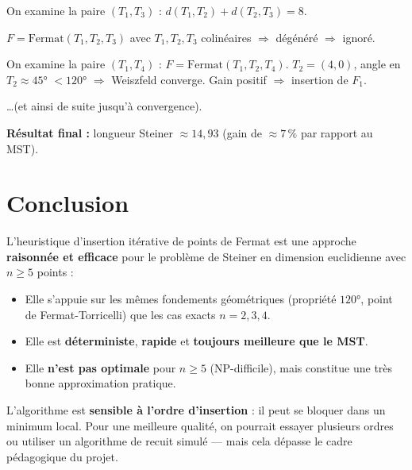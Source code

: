 \documentclass[12pt,a4paper]{article}
\begin{document}
On examine la paire $(T_1, T_3)$ :
$d(T_1, T_2) + d(T_2, T_3) = 8$.

$F = \text{Fermat}(T_1, T_2, T_3)$ avec $T_1, T_2, T_3$ colinéaires
$\Rightarrow$ dégénéré $\Rightarrow$ ignoré.

On examine la paire $(T_1, T_4)$ :
$F = \text{Fermat}(T_1, T_2, T_4)$.
$T_2 = (4,0)$, angle en $T_2 \approx 45°$ $< 120°$ $\Rightarrow$ Weiszfeld converge.
Gain positif $\Rightarrow$ insertion de $F_1$.

\ldots (et ainsi de suite jusqu'à convergence).

\medskip
\textbf{Résultat final :} longueur Steiner $\approx 14{,}93$
(gain de $\approx 7\,\%$ par rapport au MST).

\section{Conclusion}

L'heuristique d'insertion itérative de points de Fermat est une approche
\textbf{raisonnée et efficace} pour le problème de Steiner en dimension
euclidienne avec $n \geq 5$ points :

\begin{itemize}
  \item Elle s'appuie sur les mêmes fondements géométriques (propriété $120°$,
        point de Fermat-Torricelli) que les cas exacts $n = 2, 3, 4$.
  \item Elle est \textbf{déterministe}, \textbf{rapide} et
        \textbf{toujours meilleure que le MST}.
  \item Elle \textbf{n'est pas optimale} pour $n \geq 5$ (NP-difficile),
        mais constitue une très bonne approximation pratique.
\end{itemize}

\begin{tcolorbox}[warnbox={Limite principale}]
L'algorithme est \textbf{sensible à l'ordre d'insertion} :
il peut se bloquer dans un minimum local.
Pour une meilleure qualité, on pourrait essayer plusieurs ordres
ou utiliser un algorithme de recuit simulé — mais cela dépasse
le cadre pédagogique du projet.
\end{tcolorbox}
\end{document}
